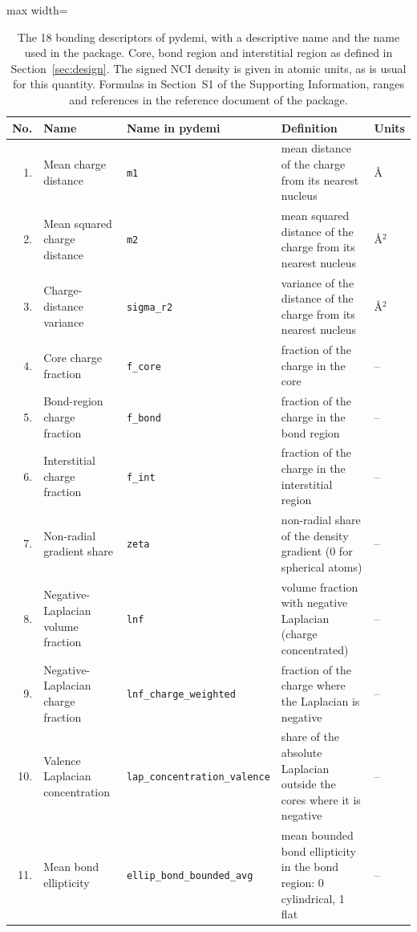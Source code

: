 \documentclass[journal=jctcce,manuscript=article,email=true]{achemso}
\newcommand{\rev}[1]{{\color{blue}#1}}
\begin{document}
\begin{table}[!tp]
\centering
\caption{The 18 bonding descriptors of pydemi, with a descriptive name and
the name used in the package. Core, \rev{bond region} and interstitial region
as defined in Section~\ref{sec:design}. The signed NCI density is given in
atomic units, as is usual for this quantity. Formulas
in Section~S1 of the Supporting Information, ranges and references in the
reference document of the package.}
\label{tab:families}
\footnotesize
\setlength{\tabcolsep}{4pt}
\begin{adjustbox}{max width=\textwidth}
\begin{tabular}{@{}r>{\raggedright\arraybackslash}p{3.7cm}l>{\raggedright\arraybackslash}p{5.4cm}l@{}}
\toprule
No. & Name & Name in pydemi & Definition & Units \\
\midrule
1. & Mean charge distance & \texttt{m1} & mean distance of the charge from its nearest nucleus & \AA \\
2. & Mean squared charge distance & \texttt{m2} & mean squared distance of the charge from its nearest nucleus & \AA$^2$ \\
3. & Charge-distance variance & \texttt{sigma\_r2} & variance of the distance of the charge from its nearest nucleus & \AA$^2$ \\
4. & Core charge fraction & \texttt{f\_core} & fraction of the charge in the core & -- \\
5. & \rev{Bond-region} charge fraction & \texttt{f\_bond} & fraction of the charge in the \rev{bond region} & -- \\
6. & Interstitial charge fraction & \texttt{f\_int} & fraction of the charge in the interstitial region & -- \\
7. & Non-radial gradient share & \texttt{zeta} & non-radial share of the density gradient (0 for spherical atoms) & -- \\
8. & Negative-Laplacian volume fraction & \texttt{lnf} & volume fraction with negative Laplacian (charge concentrated) & -- \\
9. & Negative-Laplacian charge fraction & \texttt{lnf\_charge\_weighted} & fraction of the charge where the Laplacian is negative & -- \\
10. & Valence Laplacian concentration & \texttt{lap\_concentration\_valence} & share of the absolute Laplacian outside the cores where it is negative & -- \\
11. & Mean bond ellipticity & \texttt{ellip\_bond\_bounded\_avg} & mean bounded bond ellipticity\rev{~\cite{bader1983}} in the \rev{bond region}: 0 cylindrical, 1 flat & -- \\

\end{tabular}
\end{adjustbox}
\end{table}
\end{document}

